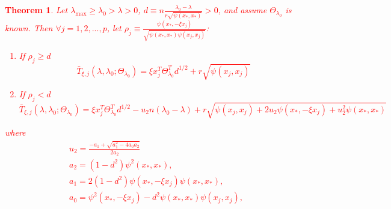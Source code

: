 \documentclass{article}
\newtheorem{theorem}{Theorem}
\providecommand{\note}[1]{\textcolor{red}{#1}}
\begin{document}
\note{
\begin{theorem}
    Let $\lambda_{\max}\geq\lambda_0>\lambda>0$, $d\equiv n\frac{\lambda_0-\lambda}{r\sqrt{\psi(x_*,x_*)}}>0$, and assume $\Theta_{\lambda_0}$ is known. Then $\forall j =1,2,...,p$, let $\rho_j\equiv\frac{\psi(x_*,-\xi x_j)}{\sqrt{\psi(x_*,x_*)\psi(x_j, x_j)}}$:
    \begin{enumerate}
        \item If $\rho_j\geq d$
        \begin{equation}
            \bar{T}_{\xi,j}(\lambda,\lambda_0;\Theta_{\lambda_0})=\xi x_j^T\Theta_{\lambda_0}^Td^{1/2}+r\sqrt{\psi(x_j,x_j)}
        \end{equation}
        \item If $\rho_j<d$
        \begin{equation}
            \bar{T}_{\xi,j}(\lambda,\lambda_0;\Theta_{\lambda_0})=\xi x_j^T\Theta_{\lambda_0}^Td^{1/2}-u_2n(\lambda_0-\lambda)+r\sqrt{\psi(x_j,x_j)+2u_2\psi(x_*,-\xi x_j)+u_2^2\psi(x_*,x_*)}
        \end{equation}
    \end{enumerate}   
    where
    \begin{equation}
        \begin{gathered}
            u_2=\frac{-a_1+\sqrt{a_1^2-4a_0a_2}}{2a_2}\\
            a_2=(1-d^2)\psi^2(x_*,x_*),\\
            a_1=2(1-d^2)\psi(x_*,-\xi x_j)\psi(x_*,x_*),\\
            a_0=\psi^2(x_*,-\xi x_j)-d^2\psi(x_*,x_*)\psi(x_j,x_j),\\
        \end{gathered}
    \end{equation}
\end{theorem}
}
\end{document}
